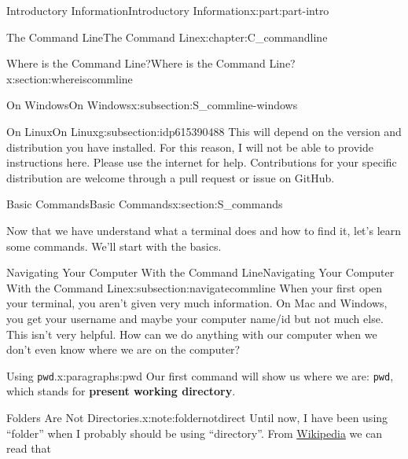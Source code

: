 \documentclass[oneside,10pt,]{book}
\newcommand{\mono}[1]{\texttt{#1}}
\newcommand{\terminology}[1]{\textbf{#1}}
\begin{document}
\begin{partptx}{Introductory Information}{}{Introductory Information}{}{}{x:part:part-intro}
\begin{chapterptx}{The Command Line}{}{The Command Line}{}{}{x:chapter:C_commandline}
\begin{sectionptx}{Where is the Command Line?}{}{Where is the Command Line?}{}{}{x:section:whereiscommline}
\begin{subsectionptx}{On Windows}{}{On Windows}{}{}{x:subsection:S_commline-windows}
\end{subsectionptx}
%
%
\typeout{************************************************}
\typeout{************************************************}
%
\begin{subsectionptx}{On Linux}{}{On Linux}{}{}{g:subsection:idp615390488}
%
This will depend on the version and distribution you have installed. For this reason, I will not be able to provide instructions here. Please use the internet for help. Contributions for your specific distribution are welcome through a pull request or issue on GitHub.%
\end{subsectionptx}
\end{sectionptx}
%
%
\typeout{************************************************}
\typeout{************************************************}
%
\begin{sectionptx}{Basic Commands}{}{Basic Commands}{}{}{x:section:S_commands}
%
%
%
\begin{introduction}{}%
Now that we have understand what a terminal does and how to find it, let's learn some commands. We'll start with the basics.%
\end{introduction}%
%
%
\typeout{************************************************}
\typeout{************************************************}
%
\begin{subsectionptx}{Navigating Your Computer With the Command Line}{}{Navigating Your Computer With the Command Line}{}{}{x:subsection:navigatecommline}
%
When your first open your terminal, you aren't given very much information. On Mac and Windows, you get your username and maybe your computer name\slash{}id but not much else. This isn't very helpful. How can we do anything with our computer when we don't even know where we are on the computer?%
\begin{paragraphs}{Using \mono{pwd}.}{x:paragraphs:pwd}%
\index{command line!\mono{pwd}}%
%
\index{\mono{pwd}}%
Our first command will show us where we are: \mono{pwd}, which stands for \terminology{present working directory}. \begin{note}{Folders Are Not Directories.}{x:note:foldernotdirect}%
Until now, I have been using ``folder'' when I probably should be using ``directory''. From \href{https://en.wikipedia.org/wiki/Directory_\%28computing\%29\#Folder_metaphor}{Wikipedia}\footnotemark{} we can read that \begin{quote}%

\end{quote}
\end{note}
\end{paragraphs}
\end{subsectionptx}
\end{sectionptx}
\end{chapterptx}
\end{partptx}
\end{document}
